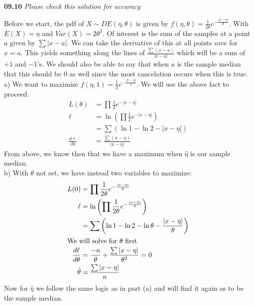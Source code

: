 

{\bf 09.10} \textit{Please check this solution for accuracy} 

Before we start, the pdf of $X \sim DE(\eta, \theta)$ is given by 
$f(\eta,\theta) = \frac{1}{2 \theta} e^{-\frac{|x - \eta|}{\theta}}$. With $E(X) = \eta$ and 
$Var(X) = 2\theta^2$. Of interest is the sum of the samples at a point $a$ given by $\sum |x - a|$.
We can take the derivative of this at all points save for $x = a$. This yields something along the
lines of $\frac{\sum (x - a)}{|x -a|}$ which will be a sum of $+1$ and $-1$'s. 
We should
also be able to say that when $a$ is the sample median that this should be $0$ as well since
the most cancelation occurs when this is true. \\

a) We want to maximize $f(\eta,1) = \frac{1}{2} e^{-\frac{|x - \eta|}{1}}$. We will use the
above fact to proceed.
\begin{align*}
	L(\theta) & = \prod \frac{1}{2} e^{-|x - \eta|} \\
	\ell & = \ln\left( \prod \frac{1}{2} e^{-|x - \eta|}\right) \\
	& = \sum \left(\ln 1 - \ln 2  -|x - \eta| \right) \\
	\frac{d \ell}{d\eta} & = \frac{\sum (x - \eta)}{|x - \eta|} 
\end{align*}
From above, we know then that we have a maximum when $\hat{\eta}$ is our sample median. \\

b) With $\theta$ not set, we have instead two variables to maximize: 
\begin{align*}
	L(0) & = \prod \frac{1}{2 \theta} e^{-\frac{|x - \eta|}{\theta}} \\
	\ell & = \ln\left(\prod \frac{1}{2 \theta} e^{-\frac{|x - \eta|}{\theta}}\right) \\
	& = \sum \left(\ln 1 - \ln 2 - \ln\theta  -\frac{|x - \eta|}{\theta} \right) \\
\intertext{We will solve for $\theta$ first}
	\frac{d \ell}{d\theta} & = \frac{-n}{\theta} + \frac{\sum |x - \eta|}{\theta^2} = 0\\
	\hat{\theta} & = \frac{ \sum |x - \eta|}{n}
\end{align*}
Now for $\hat{\eta}$ we follow the same logic as in part (a) and will find it again as to be
the sample median. \\



	
